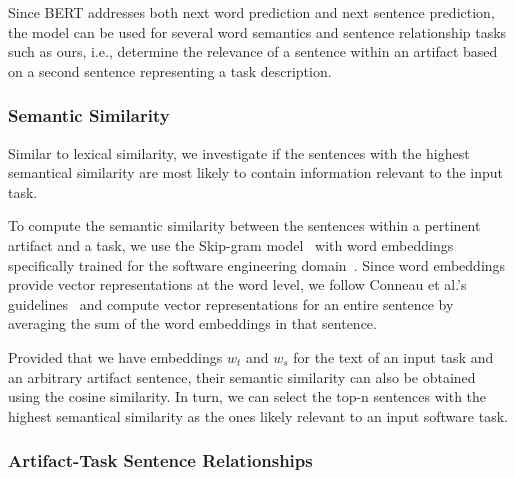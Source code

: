 Since BERT addresses both next word prediction and next sentence prediction, the model can be used for several
word semantics and sentence relationship tasks such as  ours, i.e., determine the relevance of a sentence within an artifact based on a second sentence representing a task description. 




\subsubsection{Semantic Similarity}
\label{cp5:skip-gram}


Similar to lexical similarity,  we investigate if the sentences with the highest semantical similarity are most likely to contain information relevant to the input task.


To compute the semantic similarity between the sentences within a pertinent artifact and a task,
we use the Skip-gram model~\cite{Mikolov2013} with word embeddings specifically trained for the software engineering domain~\cite{Efstathiou2018}.
Since word embeddings provide vector representations at the word level, we follow Conneau et al.'s guidelines~\cite{conneau2018} 
and compute vector representations for an entire sentence by averaging the sum of the word embeddings in that sentence.


Provided that we have embeddings $w_t$ and $w_s$ for the text 
of an input task and an arbitrary artifact sentence, 
their semantic similarity can also be obtained 
using the cosine similarity. In turn, we can select the top-n sentences
with the highest semantical similarity as the ones likely relevant to an input software task.




\subsubsection{Artifact-Task Sentence Relationships}
\label{cp5:bert}


